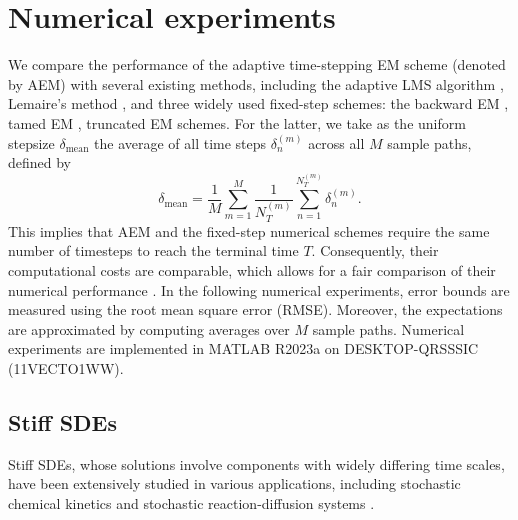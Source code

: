\documentclass[preprint,12pt,compress]{elsarticle}
\begin{document}
\section{Numerical experiments}  \label{sec9}
We compare the performance of the adaptive time-stepping EM scheme (denoted by AEM) with several existing methods, including the adaptive LMS algorithm \cite{lamba2007an}, Lemaire's method \cite{lemaire2007an}, and three widely used fixed-step schemes: the backward EM \cite{kloeden1992numerical, hu1996semi}, tamed EM \cite{hutzenthaler2012strong, sabanis2016euler}, truncated EM \cite{li2019explicit} schemes. For the latter, we take as the uniform stepsize $\delta_{\mathrm{mean}}$ the average of all time steps $\delta_n^{(m)}$ across all $M$ sample paths, defined by
\begin{equation}
	{\delta_{\mathrm{mean}}} = \frac{1}{M}\sum\limits_{m = 1}^M {\frac{1}{{{N_T^{(m)}}}}\sum\limits_{n = 1}^{{N_T^{(m)}}} {\delta _n^{(m)}} }. 
\end{equation}
This implies that AEM and the fixed-step numerical schemes require the same number of timesteps to reach the terminal time $T$. Consequently, their computational costs are comparable, which allows for a fair comparison of their numerical performance \cite{kelly2018adaptive}. In the following numerical experiments, error bounds are measured using the root mean square error (RMSE). Moreover, the expectations are approximated by computing averages over $M$ sample paths. Numerical experiments are implemented in  MATLAB R2023a on DESKTOP-QRSSSIC (11VECTO1WW).


\subsection{Stiff SDEs}
Stiff SDEs, whose solutions involve components with widely differing time scales, have been extensively studied in various applications, including stochastic chemical kinetics \cite{rathinam2003stiffness,ilie2012adaptive} and stochastic reaction-diffusion systems \cite{ta2015an}.
\end{document}
